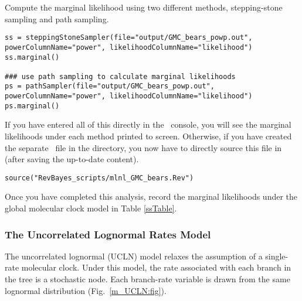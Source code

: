 Compute the marginal likelihood using two different methods, stepping-stone sampling and path sampling. 
{\tt \begin{snugshade*}
\begin{lstlisting}
ss = steppingStoneSampler(file="output/GMC_bears_powp.out", powerColumnName="power", likelihoodColumnName="likelihood")
ss.marginal() 

### use path sampling to calculate marginal likelihoods
ps = pathSampler(file="output/GMC_bears_powp.out", powerColumnName="power", likelihoodColumnName="likelihood")
ps.marginal() 
\end{lstlisting}
\end{snugshade*}}

If you have entered all of this directly in the \RevBayes~console, you will see the marginal likelihoods under each method printed to screen. 
Otherwise, if you have created the separate \Rev~file 
{\textcolor{red}{}} in the  directory, you now have to directly source this file in \RevBayes (after saving the up-to-date content). 

{\tt \begin{snugshade*}
\begin{lstlisting}
source("RevBayes_scripts/mlnl_GMC_bears.Rev")
\end{lstlisting}
\end{snugshade*}}

{\begin{framed}
Once you have completed this analysis, record the marginal likelihoods under the global molecular clock model in Table \ref{ssTable}.
\end{framed}}

\bigskip
\subsubsection{The Uncorrelated Lognormal Rates Model}\label{UCLNModelSec}

The uncorrelated lognormal (UCLN) model relaxes the assumption of a single-rate molecular clock. 
Under this model, the rate associated with each branch in the tree is a stochastic node.
Each branch-rate variable is drawn from the same lognormal distribution (Fig.~\ref{m_UCLN:fig}).

